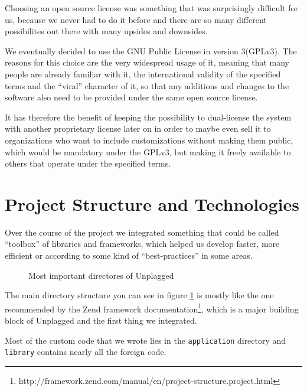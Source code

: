Choosing an open source license was something that was surprisingly difficult for us,
because we never had to do it before and there are so many different possibilites out there with many upsides and downsides.

We eventually decided to use the GNU Public License in version 3(GPLv3). The reasons for this choice are the very widespread usage of it, meaning that many people are already 
familiar with it, the international validity of the specified terms and the \enquote{viral}
character of it, so that any additions and changes to the software also need to be provided 
under the same open source license.

It has therefore the benefit of keeping the possibility to dual-license the system with another proprietary license later on in order to maybe even sell it to organizations who want to include
customizations without making them public, which would be mandatory under the GPLv3, but making it freely available to others that operate under the specified terms.

\section{Project Structure and Technologies}

Over the course of the project we integrated something that could be called \enquote{toolbox} of libraries and frameworks, which 
helped us develop faster, more efficient or according to some kind of \enquote{best-practices}
in some areas.

\begin{figure}[!h]
\caption{Most important directores of Unplagged}
  \label{fig:directoryStructure}
\end{figure}

The main directory structure you can see in figure \ref{fig:directoryStructure} is mostly like the one recommended by the Zend framework documentation\footnote{http://framework.zend.com/manual/en/project-structure.project.html}, which is a major building block of 
Unplagged and the first thing we integrated.

Most of the custom code that we wrote lies in the \texttt{application} directory and \texttt{library} contains nearly all the foreign code.

